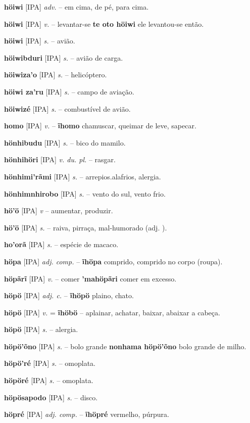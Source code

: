 \textbf{höiwi} [IPA] \textit{adv.} -- em cima, de pé, para cima.

\textbf{höiwi} [IPA] \textit{v.} -- levantar-se  \textbf{te oto höiwi} ele levantou-se então.

\textbf{höiwi} [IPA] \textit{s.} -- avião.

\textbf{höiwibduri} [IPA] \textit{s.} -- avião de carga.

\textbf{höiwiza'o} [IPA] \textit{s.} -- helicóptero.

\textbf{höiwi za'ru} [IPA] \textit{s.} -- campo de aviação.

\textbf{höiwizé} [IPA] \textit{s.} -- combustível de avião.

\textbf{homo} [IPA] \textit{v.} -- \textbf{ĩhomo} chamuscar, queimar de leve, sapecar.

\textbf{hönhibudu} [IPA] \textit{s.} -- bico do mamilo.

\textbf{hönhihöri} [IPA] \textit{v. du. pl.} -- rasgar.

\textbf{hönhimi'rãmi} [IPA] \textit{s.} -- arrepios.alafrios, alergia.

\textbf{hönhimnhirobo} [IPA] \textit{s.} -- vento do sul, vento frio.

\textbf{hö'ö} [IPA] \textit{v} -- aumentar, produzir.

\textbf{hö'ö} [IPA] \textit{s.} -- raiva, pirraça, mal-humorado (adj. ).

\textbf{ho'orã} [IPA] \textit{s.} -- espécie de macaco.

\textbf{höpa} [IPA] \textit{adj. comp.} -- \textbf{ĩhöpa} comprido, comprido no corpo (roupa).

\textbf{höpãrĩ} [IPA] \textit{v.} -- comer  \textbf{'mahöpãri} comer em excesso.

\textbf{höpö} [IPA] \textit{adj. c.} -- \textbf{ĩhöpö} plaino, chato.

\textbf{höpö} [IPA] \textit{v.} = \textbf{ĩhöbö} -- aplainar, achatar, baixar, abaixar a cabeça.

\textbf{höpö} [IPA] \textit{s.} -- alergia.

\textbf{höpö'õno} [IPA] \textit{s.} -- bolo grande  \textbf{nonhama höpö'õno} bolo grande de milho.

\textbf{höpö'ré} [IPA] \textit{s.} -- omoplata.

\textbf{höpöré} [IPA] \textit{s.} -- omoplata.

\textbf{höpösapodo} [IPA] \textit{s.} -- disco.

\textbf{höpré} [IPA] \textit{adj. comp.} -- \textbf{ĩhöpré} vermelho, púrpura.

